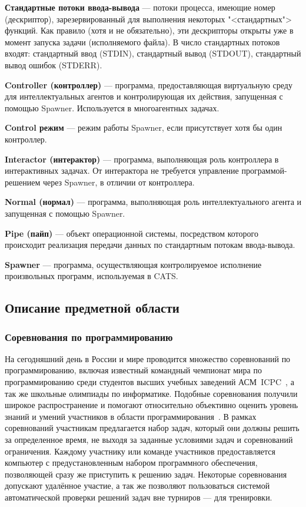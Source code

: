 \documentclass{imcs}
\begin{document}
\textbf{Стандартные потоки ввода-вывода} — потоки процесса, имеющие номер (дескриптор), зарезервированный для выполнения некоторых "<стандартных"> функций. Как правило (хотя и не обязательно), эти дескрипторы открыты уже в момент запуска задачи (исполняемого файла). В число стандартных потоков входят: стандартный ввод (STDIN), стандартный вывод (STDOUT), стандартный вывод ошибок (STDERR).

\textbf{Controller (контроллер)} — программа, предоставляющая виртуальную среду для интеллектуальных агентов и контролирующая их действия, запущенная с помощью Spawner. Используется в многоагентных задачах.

\textbf{Control режим} — режим работы Spawner, если присутствует хотя бы  один контроллер.

\textbf{Interactor (интерактор)} — программа, выполняющая роль контроллера в интерактивных задачах. От интерактора не требуется управление программой-решением через Spawner, в отличии от контроллера.

\textbf{Normal (нормал)} — программа, выполняющая роль интеллектуального агента и запущенная с помощью Spawner.

\textbf{Pipe (пайп)} — объект операционной системы, посредством которого происходит реализация передачи данных по стандартным потокам ввода-вывода.

\textbf{Spawner} — программа, осуществляющая контролируемое исполнение произвольных программ, используемая в CATS.


\subsection{Описание предметной области}
\subsubsection{Соревнования по программированию}
На сегодняшний день в России и мире проводится множество соревнований по программированию, включая известный командный чемпионат мира по программированию среди студентов высших учебных заведений АСМ~ICPC~\cite{acm}, а так же школьные олимпиады по информатике. Подобные соревнования получили широкое распространение и помогают относительно объективно оценить уровень знаний и умений участников в области программирования~\cite{prog_challenges}. В рамках соревнований участникам предлагается набор задач, который они должны решить за определенное время, не выходя за заданные условиями задач и соревнований ограничения. Каждому участнику или команде участников предоставляется компьютер с предустановленным набором программного обеспечения, позволяющей сразу же приступить к решению задач. Некоторые соревнования допускают удалённое участие, а так же позволяют пользоваться системой автоматической проверки решений задач вне турниров — для тренировки.
\end{document}
